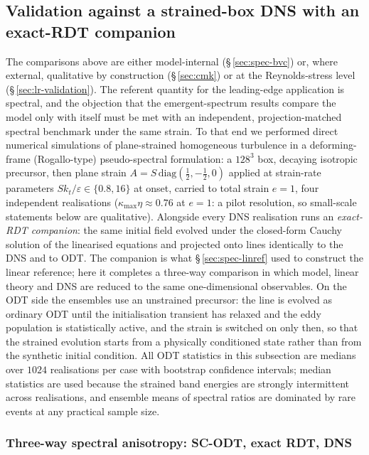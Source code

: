 \documentclass[11pt,a4paper]{article}
\begin{document}
\subsection{Validation against a strained-box DNS with an exact-RDT
companion}\label{sec:box-dns}

The comparisons above are either model-internal
(\S\,\ref{sec:spec-bvc}) or, where external, qualitative by construction
(\S\,\ref{sec:cmk}) or at the Reynolds-stress level
(\S\,\ref{sec:lr-validation}). The referent quantity for the
leading-edge application is spectral, and the objection that the
emergent-spectrum results compare the model only with itself must be met
with an independent, projection-matched spectral benchmark under the
same strain. To that end
we performed direct numerical simulations of plane-strained homogeneous
turbulence in a deforming-frame (Rogallo-type) pseudo-spectral formulation:
a $128^3$ box, decaying isotropic precursor, then plane strain
$A=S\,\mathrm{diag}(\tfrac12,-\tfrac12,0)$ applied at strain-rate
parameters $Sk_t/\varepsilon\in\{0.8,16\}$ at onset, carried to total
strain $e=1$, four independent realisations
($\kappa_{\max}\eta\approx0.76$ at $e=1$: a pilot resolution, so
small-scale statements below are qualitative). Alongside every DNS
realisation runs an \emph{exact-RDT companion}: the same initial field
evolved under the closed-form Cauchy solution of the linearised equations
and projected onto lines identically to the DNS and to ODT. The companion
is what \S\,\ref{sec:spec-linref} used to construct the linear reference;
here it completes a three-way comparison in which model, linear theory and
DNS are reduced to the same one-dimensional observables. On the ODT side
the ensembles use an unstrained precursor: the line is evolved as ordinary
ODT until the initialisation transient has relaxed and the eddy population
is statistically active, and the strain is switched on only then, so that
the strained evolution starts from a physically conditioned state rather
than from the synthetic initial condition. All ODT statistics in this
subsection are medians over $1024$ realisations per case with bootstrap
confidence intervals; median statistics are used because the strained band
energies are strongly intermittent across realisations, and ensemble means
of spectral ratios are dominated by rare events at any practical sample
size.

\subsubsection{Three-way spectral anisotropy: SC-ODT, exact RDT,
DNS}\label{sec:threeway}
\end{document}
